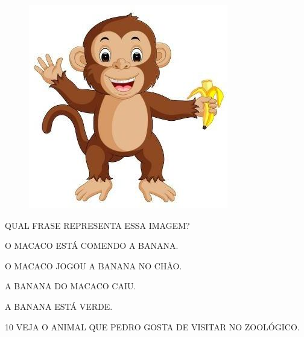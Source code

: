 \begin{figure}[H]
\centering
\includegraphics[width=.3\textwidth]{media/image218.jpg}
\end{figure}

QUAL FRASE REPRESENTA ESSA IMAGEM?

\begin{escolha}
\item O MACACO ESTÁ COMENDO A BANANA.

\item O MACACO JOGOU A BANANA NO CHÃO.

\item A BANANA DO MACACO CAIU.

\item A BANANA ESTÁ VERDE.
\end{escolha}

\num{10} VEJA O ANIMAL QUE PEDRO GOSTA DE VISITAR NO ZOOLÓGICO.

